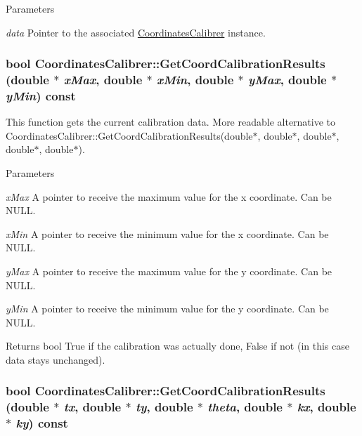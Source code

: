 \begin{DoxyParams}{Parameters}
\item[{\em data}]Pointer to the associated \hyperlink{classCoordinatesCalibrer}{CoordinatesCalibrer} instance. \end{DoxyParams}
\hypertarget{classCoordinatesCalibrer_a1a3ae703556c2f4c4455792a43fed987}{
\subsubsection[{GetCoordCalibrationResults}]{\setlength{\rightskip}{0pt plus 5cm}bool CoordinatesCalibrer::GetCoordCalibrationResults (double $\ast$ {\em xMax}, \/  double $\ast$ {\em xMin}, \/  double $\ast$ {\em yMax}, \/  double $\ast$ {\em yMin}) const}}
\label{classCoordinatesCalibrer_a1a3ae703556c2f4c4455792a43fed987}


This function gets the current calibration data. More readable alternative to CoordinatesCalibrer::GetCoordCalibrationResults(double$\ast$, double$\ast$, double$\ast$, double$\ast$, double$\ast$). 


\begin{DoxyParams}{Parameters}
\item[{\em xMax}]A pointer to receive the maximum value for the x coordinate. Can be NULL. \item[{\em xMin}]A pointer to receive the minimum value for the x coordinate. Can be NULL. \item[{\em yMax}]A pointer to receive the maximum value for the y coordinate. Can be NULL. \item[{\em yMin}]A pointer to receive the minimum value for the y coordinate. Can be NULL. \end{DoxyParams}
\begin{DoxyReturn}{Returns}
bool True if the calibration was actually done, False if not (in this case data stays unchanged). 
\end{DoxyReturn}
\hypertarget{classCoordinatesCalibrer_a92672252bda26bddd9b8c73bc6395ea3}{
\subsubsection[{GetCoordCalibrationResults}]{\setlength{\rightskip}{0pt plus 5cm}bool CoordinatesCalibrer::GetCoordCalibrationResults (double $\ast$ {\em tx}, \/  double $\ast$ {\em ty}, \/  double $\ast$ {\em theta}, \/  double $\ast$ {\em kx}, \/  double $\ast$ {\em ky}) const}}
\label{classCoordinatesCalibrer_a92672252bda26bddd9b8c73bc6395ea3}


